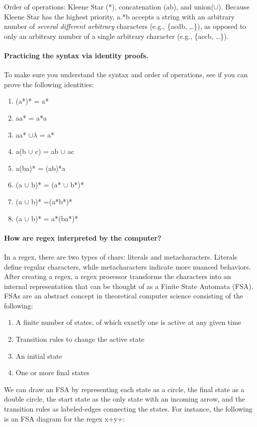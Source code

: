 \documentclass[10pt]{article}
\begin{document}
Order of operations: Kleene Star (*), concatenation (ab), and union($\cup$).
Because Kleene Star has the highest priority, a.*b accepts a string
with an arbitrary number of \textit{several different arbitrary} characters
 (e.g., \{acdb, \ldots\}), as opposed
to only an arbitrary number of a single arbitrary character (e.g., \{accb, \ldots\}).

\paragraph{Practicing the syntax via identity proofs.}
To make sure you understand the syntax and order of operations,
see if you can prove the following identities:
\begin{enumerate}
\item (a*)* = a*
\item aa* = a*a
\item aa* $\cup \lambda$ = a*
\item a(b $\cup$ c) = ab $\cup$ ac
\item a(ba)* = (ab)*a
\item (a $\cup$ b)* = (a* $\cup$ b*)*
\item (a $\cup$ b)* =(a*b*)*
\item (a $\cup$ b)* = a*(ba*)*
\end{enumerate}

\paragraph{How are regex interpreted by the computer?}
In a regex, there are two types of chars: literals and metacharacters.
Literals define regular characters, while metacharacters indicate
more nuanced behaviors.
After creating a regex, a regex processor transforms the characters into an internal
representation that can be thought of as a Finite State Automata (FSA).
FSAs are an abstract concept in theoretical computer science consisting of the following:
\begin{enumerate}
\item A finite number of states, of which exactly one is active at any given time
\item Transition rules to change the active state
\item An initial state
\item One or more final states
\end{enumerate}
We can draw an FSA by representing each state as a circle, the final state
as a double circle, the start state as the only state with an incoming arrow,
and the transition rules as labeled-edges connecting the states.
For instance, the following is an FSA diagram for the regex x+y+:
\end{document}
